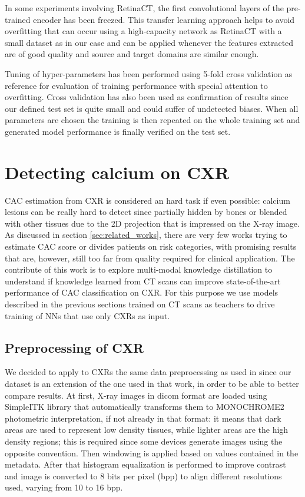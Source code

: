 In some experiments involving RetinaCT, the first convolutional layers of the pre-trained encoder has been freezed.
This transfer learning approach helps to avoid overfitting that can occur using a high-capacity network as RetinaCT with a small dataset as in our case and can be applied whenever the features extracted are of good quality and source and target domains are similar enough.

Tuning of hyper-parameters has been performed using 5-fold cross validation as reference for evaluation of training performance with special attention to overfitting.
Cross validation has also been used as confirmation of results since our defined test set is quite small and could suffer of undetected biases.
When all parameters are chosen the training is then repeated on the whole training set and generated model performance is finally verified on the test set.


\section{Detecting calcium on CXR}\label{sec:detecting_calcium_on_cxr}

CAC estimation from CXR is considered an hard task if even possible: calcium lesions can be really hard to detect since partially hidden by bones or blended with other tissues due to the 2D projection that is impressed on the X-ray image.
As discussed in section \ref{sec:related_works}, there are very few works trying to estimate CAC score or divides patients on risk categories, with promising results that are, however, still too far from quality required for clinical application.
The contribute of this work is to explore multi-modal knowledge distillation to understand if knowledge learned from CT scans can improve state-of-the-art performance of CAC classification on CXR.
For this purpose we use models described in the previous sections trained on CT scans as teachers to drive training of NNs that use only CXRs as input.


\subsection{Preprocessing of CXR}

We decided to apply to CXRs the same data preprocessing as used in \cite{iodice_2022} since our dataset is an extension of the one used in that work, in order to be able to better compare results.
At first, X-ray images in dicom format are loaded using SimpleITK library \cite{lowekamp2013design} that automatically transforms them to MONOCHROME2 photometric interpretation, if not already in that format: it means that dark areas are used to represent low density tissues, while lighter areas are the high density regions; this is required since some devices generate images using the opposite convention.
Then windowing is applied based on values contained in the metadata.
After that histogram equalization is performed to improve contrast and image is converted to 8 bits per pixel (bpp) to align different resolutions used, varying from 10 to 16 bpp.


